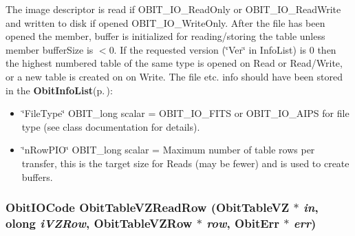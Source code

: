 The image descriptor is read if OBIT\_\-IO\_\-Read\-Only or OBIT\_\-IO\_\-Read\-Write and written to disk if opened OBIT\_\-IO\_\-Write\-Only. After the file has been opened the member, buffer is initialized for reading/storing the table unless member buffer\-Size is $<$0. If the requested version (\char`\"{}Ver\char`\"{} in Info\-List) is 0 then the highest numbered table of the same type is opened on Read or Read/Write, or a new table is created on on Write. The file etc. info should have been stored in the {\bf Obit\-Info\-List}{\rm (p.\,\pageref{structObitInfoList})}: \begin{itemize}
\item \char`\"{}File\-Type\char`\"{} OBIT\_\-long scalar = OBIT\_\-IO\_\-FITS or OBIT\_\-IO\_\-AIPS for file type (see class documentation for details). \item \char`\"{}n\-Row\-PIO\char`\"{} OBIT\_\-long scalar = Maximum number of table rows per transfer, this is the target size for Reads (may be fewer) and is used to create buffers. 
\end{itemize}
\subsubsection{\setlength{\rightskip}{0pt plus 5cm}Obit\-IOCode Obit\-Table\-VZRead\-Row ({\bf Obit\-Table\-VZ} $\ast$ {\em in}, {\bf olong} {\em i\-VZRow}, {\bf Obit\-Table\-VZRow} $\ast$ {\em row}, {\bf Obit\-Err} $\ast$ {\em err})}\label{ObitTableVZ_8h_a18}


